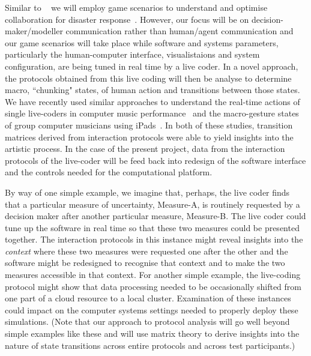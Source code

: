 \documentclass[a4paper,fontsize=12pt]{scrartcl}
\begin{document}
Similar to ~\parencite{ramchurn2016human} we will employ game scenarios to understand and optimise 
collaboration for disaster response~\parencite{ramchurn2016human}.
However, our focus will be on  decision-maker/modeller communication rather than human/agent communication and our game scenarios will take place while software and systems parameters, particularly the human-computer interface, visualistaions and system configuration, are being tuned in real time by a live coder.  In a novel approach, the protocols obtained from this live coding will then be analyse to determine macro, ``chunking" states, of human action and transitions between those states. We have recently used similar approaches to understand the real-time actions of single live-coders in computer music performance~\parencite{swift2014coding} and the macro-gesture states of group computer musicians using iPads~. In both of these studies, transition matrices derived from interaction protocols were able to yield insights into the artistic process. In the case of the present project, data from the interaction protocols of the live-coder will be feed back into redesign of the software interface and the controls needed for the computational platform.

By way of one simple example, we imagine that, perhaps, the live coder finds that a particular measure of uncertainty, Measure-A, is routinely requested by a decision maker after another particular measure, Measure-B. The live coder could tune up the software in real time so that these two measures could be presented together. The interaction protocols in this instance might reveal insights into the {\em context} where these two measures were requested one after the other and the software might be redesigned to recognise that context and to make the two measures accessible in that context. For another simple example, the live-coding protocol might show that data processing needed to be occasionally shifted from one part of a cloud resource to a local cluster. Examination of these instances could impact on the computer systems settings needed to properly deploy these simulations. (Note that our approach to protocol analysis will go well beyond simple examples like these and will use matrix theory to derive insights into the nature of state transitions across entire protocols and across test participants.)\\


\\
\end{document}
